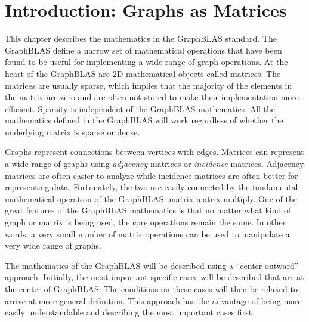 %

%

\setcounter{chapter}{1}
\label{chap:mathematics}
\section{Introduction: Graphs as Matrices}
This chapter describes the mathematics in the GraphBLAS standard.  The GraphBLAS define a narrow set of mathematical operations that have been found to be useful for implementing a wide range of graph operations.  At the heart of the GraphBLAS are 2D mathematical objects called matrices.  The matrices are usually sparse, which implies that the majority of the elements in the matrix are zero and are often not stored to make their implementation more efficient.  Sparsity is independent of the GraphBLAS mathematics.  All the mathematics defined in the GraphBLAS will work regardless of whether the underlying matrix is sparse or dense.

Graphs represent connections between vertices with edges.  Matrices can represent a wide range of graphs using \emph{adjacency} matrices or \emph{incidence} matrices.  Adjacency matrices are often easier to analyze while incidence matrices are often better for representing data.  Fortunately, the two are easily connected by the fundamental mathematical operation of the GraphBLAS: matrix-matrix multiply.  One of the great features of the GraphBLAS mathematics is that no matter what kind of graph or matrix is being used, the core operations remain the same.  In other words, a very small number of matrix operations can be used to manipulate a very wide range of graphs.

The mathematics of the GraphBLAS will be described using a ``center outward'' approach.  Initially, the most important specific cases will be described that are at the center of GraphBLAS.  The conditions on these cases will then be relaxed to arrive at more general definition.  This approach has the advantage of being more easily understandable and describing the most important cases first.

